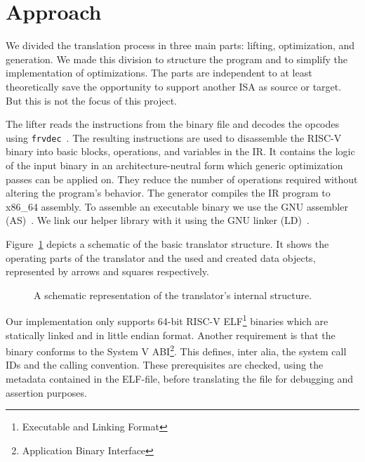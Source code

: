 \documentclass[course=eragp]{aspdoc}
\begin{document}
\section{Approach}\label{sec:approach}

We divided the translation process in three main parts: lifting, optimization, and generation. We
made this division to structure the program and to simplify the implementation of optimizations.
The parts are independent to at least theoretically save the opportunity to support another ISA as
source or target. But this is not the focus of this project.

\par

The lifter reads the instructions from the binary file and decodes the opcodes using
\texttt{frvdec}~\cite{frvdec}. The resulting instructions are used to disassemble the RISC-V binary into basic
blocks, operations, and variables in the IR. It contains the logic of
the input binary in an architecture-neutral form which generic optimization passes can be applied
on. They reduce the number of operations required without altering the program's behavior. The
generator compiles the IR program to x86\_64 assembly. To assemble an executable binary we use the
GNU assembler (AS)~\cite{gnu_binutils}. We link our helper library with it using the GNU linker
(LD)~\cite{gnu_binutils}.

\par

Figure~\ref{program_overview} depicts a schematic of the basic translator structure. It shows the
operating parts of the translator and the used and created data objects, represented by arrows and
squares respectively.

\begin{figure}
    \centering
    \caption{
        A schematic representation of the translator's internal structure.
    }\label{program_overview}
\end{figure}

\par

Our implementation only supports 64-bit RISC-V ELF\footnote{Executable and Linking Format} binaries
which are statically linked and in little endian format. Another requirement is that the binary
conforms to the System V ABI\footnote{Application Binary Interface}. This defines, inter alia, the
system call IDs and the calling convention. These prerequisites are checked, using the metadata
contained in the ELF-file, before translating the file for debugging and assertion purposes.
\end{document}
